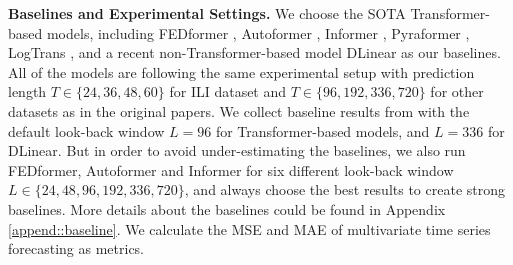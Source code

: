 \documentclass{article} %
\begin{document}

\begin{table}[htbp!]
\centering
{}
\caption{Statistics of popular datasets for benchmark.}
\label{tab:data}
\end{table}


\textbf{Baselines and Experimental Settings.} We choose the SOTA Transformer-based models, including FEDformer \citep{fedformer}, Autoformer \citep{autoformer}, Informer \citep{informer}, Pyraformer \citep{pyraformer}, LogTrans \citep{logtrans}, and a recent non-Transformer-based model DLinear \citep{dlinear} as our baselines. All of the models are following the same experimental setup with prediction length $T\in \{24, 36, 48, 60\}$ for ILI dataset and $T\in \{96, 192, 336, 720\}$ for other datasets as in the original papers. We collect baseline results from \citet{dlinear} with the default look-back window $L=96$ for Transformer-based models, and $L=336$ for DLinear. But in order to avoid under-estimating the baselines, we also run FEDformer, Autoformer and Informer for six different look-back window $L\in \{24, 48, 96, 192, 336, 720\}$, and always choose the best results to create strong baselines. More details about the baselines could be found in Appendix \ref{append::baseline}. We calculate the MSE and MAE of multivariate time series forecasting as metrics. 
\end{document}
